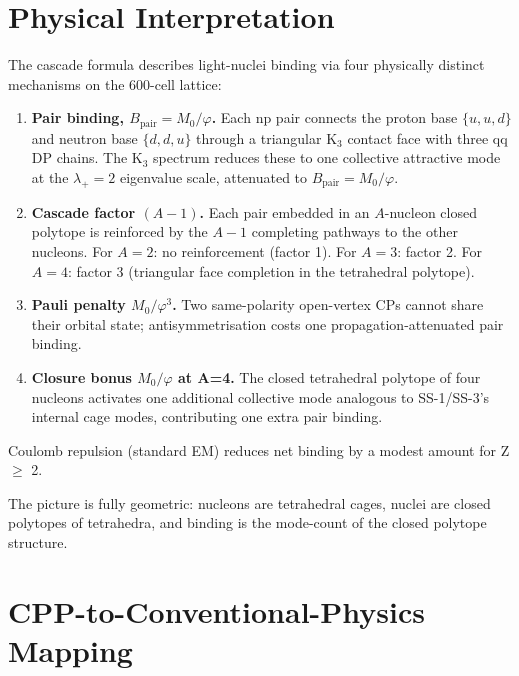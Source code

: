 \documentclass[11pt,letterpaper]{article}
\newcommand{\phig}{\varphi}
\newcommand{\Mzero}{M_0}
\newcommand{\Bpair}{B_{\mathrm{pair}}}
\begin{document}
\section{Physical Interpretation}
\label{sec:interpretation}

The cascade formula describes light-nuclei binding via four physically distinct mechanisms on the 600-cell lattice:

\begin{enumerate}
\item \textbf{Pair binding, $\Bpair = \Mzero/\phig$.} Each np pair connects the proton base $\{u,u,d\}$ and neutron base $\{d,d,u\}$ through a triangular K$_3$ contact face with three qq DP chains. The K$_3$ spectrum reduces these to one collective attractive mode at the $\lambda_+ = 2$ eigenvalue scale, attenuated to $\Bpair = \Mzero/\phig$.
\item \textbf{Cascade factor $(A-1)$.} Each pair embedded in an $A$-nucleon closed polytope is reinforced by the $A-1$ completing pathways to the other nucleons. For $A = 2$: no reinforcement (factor 1). For $A = 3$: factor 2. For $A = 4$: factor 3 (triangular face completion in the tetrahedral polytope).
\item \textbf{Pauli penalty $\Mzero/\phig^{3}$.} Two same-polarity open-vertex CPs cannot share their orbital state; antisymmetrisation costs one propagation-attenuated pair binding.
\item \textbf{Closure bonus $\Mzero/\phig$ at A=4.} The closed tetrahedral polytope of four nucleons activates one additional collective mode analogous to SS-1/SS-3's internal cage modes, contributing one extra pair binding.
\end{enumerate}

Coulomb repulsion (standard EM) reduces net binding by a modest amount for Z $\geq$ 2.

The picture is fully geometric: nucleons are tetrahedral cages, nuclei are closed polytopes of tetrahedra, and binding is the mode-count of the closed polytope structure.

\section{CPP-to-Conventional-Physics Mapping}
\label{sec:mapping}
\end{document}
